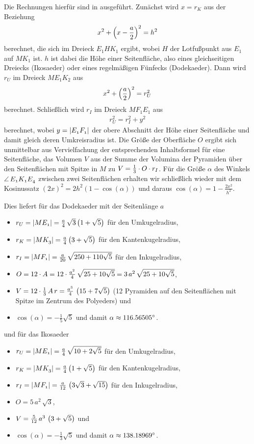 \documentclass[11pt]{article}
\begin{document}
Die Rechnungen hierfür sind in \cite{Fendt1, Fendt2} ausgeführt.  Zunächst
wird $x=r_K$ aus der Beziehung 
\begin{gather*}
  x^2+\left(x-\frac{a}{2}\right)^2=h^2
\end{gather*}
berechnet, die sich im Dreieck $E_1HK_1$ ergibt, wobei $H$ der Lotfußpunkt aus
$E_1$ auf $MK_1$ ist.  $h$ ist dabei die Höhe einer Seitenfläche, also eines
gleichseitigen Dreiecks (Ikosaeder) oder eines regelmäßigen Fünfecks
(Dodekaeder).  Dann wird $r_U$ im Dreieck $ME_1K_2$ aus
\begin{gather*}
  x^2+\left(\frac{a}{2}\right)^2=r_U^2
\end{gather*}
berechnet.  Schließlich wird $r_I$ im Dreieck $MF_1E_1$ aus
\begin{gather*}
  r_U^2=r_I^2+y^2
\end{gather*}
berechnet, wobei $y=\left\vert {\mathnormal{E_1F_1}}\right\vert$ der obere Abschnitt der Höhe einer
Seitenfläche und damit gleich deren Umkreisradius ist.  Die Größe der
Oberfläche $O$ ergibt sich unmittelbar aus Vervielfachung der entsprechenden
Inhaltsformel für eine Seitenfläche, das Volumen $V$ aus der Summe der
Volumina der Pyramiden über den Seitenflächen mit Spitze in $M$ zu
$V=\frac13\cdot O\cdot r_I$.  Für die Größe $\alpha$ des Winkels
$\kangle{E_1K_1E_4}$ zwischen zwei Seitenflächen erhalten wir schließlich
wieder mit dem Kosinussatz $(2x)^2=2h^2(1-\cos(\alpha))$ und daraus
$\cos(\alpha)=1-\frac{2x^2}{h^2}$.  

Dies liefert für das Dodekaeder mit der Seitenlänge $a$
\begin{itemize}
\item $r_U=\left\vert {\mathnormal{ME_1}}\right\vert=\frac{a}{4}\,\sqrt{3}\left(1+\sqrt{5}\right)$ für den
  Umkugelradius,
\item $r_K=\left\vert {\mathnormal{MK_3}}\right\vert=\frac{a}{4}\left(3+\sqrt{5}\right)$ für den
  Kantenkugelradius,
\item $r_I=\left\vert {\mathnormal{MF_1}}\right\vert=\frac{a}{20}\,\sqrt{250+110\sqrt{5}}$ für den
  Inkugelradius,
\item $O=12\cdot A=12\cdot\frac{a^2}{4}\,\sqrt{25+10\sqrt{5}}
  =3\,a^2\,\sqrt{25+10\sqrt{5}}$,
\item $V=12\cdot\frac13\,A\,r =\frac{a^3}{4}\,\left(15+7\sqrt{5}\right)$ (12 Pyramiden
  auf den Seitenflächen mit Spitze im Zentrum des Polyeders) und
\item $\cos(\alpha)=-\frac15\sqrt{5}$ und damit $\alpha\approx
  116.56505^{\circ}$.
\end{itemize}
und für das Ikosaeder
\begin{itemize}
\item $r_U=\left\vert {\mathnormal{ME_1}}\right\vert=\frac{a}{4}\,\sqrt{10+2\sqrt{5}}$ für den
  Umkugelradius,
\item $r_K=\left\vert {\mathnormal{MK_3}}\right\vert=\frac{a}{4}\left(1+\sqrt{5}\right)$ für den
  Kantenkugelradius,
\item $r_I=\left\vert {\mathnormal{MF_1}}\right\vert=\frac{a}{12}\,\left(3\sqrt{3}+\sqrt{15}\right)$ für den
  Inkugelradius,
\item $O=5\,a^2\,\sqrt{3}$,
\item $V=\frac{5}{12}\,a^3\,\left(3+\sqrt{5}\right)$ und
\item $\cos(\alpha)=-\frac13\sqrt{5}$ und damit $\alpha\approx
  138.18969^{\circ}$.
\end{itemize}
\end{document}
